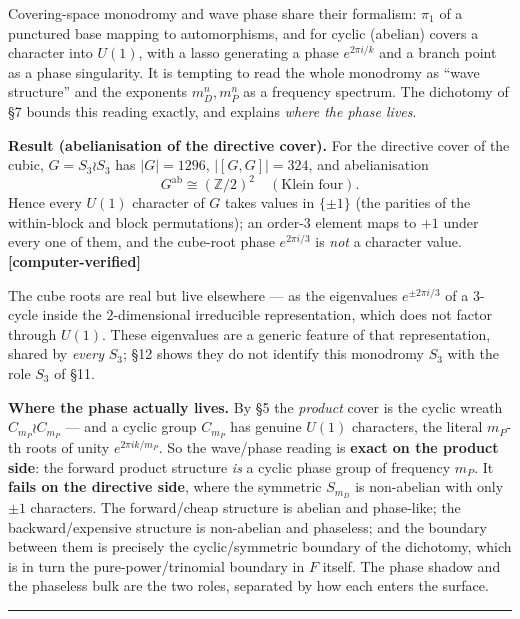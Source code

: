 \documentclass[11pt]{article}
\theoremstyle{plain}
\theoremstyle{definition}
\theoremstyle{remark}
\begin{document}
Covering-space monodromy and wave phase share their formalism: \(\pi_1\) of a punctured base mapping to automorphisms, and for cyclic (abelian) covers a character into \(U(1)\), with a lasso generating a phase \(e^{2\pi i/k}\) and a branch point as a phase singularity. It is tempting to read the whole monodromy as ``wave structure'' and the exponents \(m_D^n, m_P^n\) as a frequency spectrum. The dichotomy of §7 bounds this reading exactly, and explains \emph{where the phase lives}.

\textbf{Result (abelianisation of the directive cover).} For the directive cover of the cubic, \(G = S_3\wr S_3\) has \(|G| = 1296\), \(|[G,G]| = 324\), and abelianisation \[
G^{\mathrm{ab}} \cong (\mathbb Z/2)^2 \quad(\text{Klein four}).
\] Hence every \(U(1)\) character of \(G\) takes values in \(\{\pm 1\}\) (the parities of the within-block and block permutations); an order-\(3\) element maps to \(+1\) under every one of them, and the cube-root phase \(e^{2\pi i/3}\) is \emph{not} a character value. \textbf{{[}computer-verified{]}}

The cube roots are real but live elsewhere --- as the eigenvalues \(e^{\pm 2\pi i/3}\) of a \(3\)-cycle inside the \(2\)-dimensional irreducible representation, which does not factor through \(U(1)\). These eigenvalues are a generic feature of that representation, shared by \emph{every} \(S_3\); §12 shows they do not identify this monodromy \(S_3\) with the role \(S_3\) of §11.

\textbf{Where the phase actually lives.} By §5 the \emph{product} cover is the cyclic wreath \(C_{m_P}\wr C_{m_P}\) --- and a cyclic group \(C_{m_P}\) has genuine \(U(1)\) characters, the literal \(m_P\)-th roots of unity \(e^{2\pi i k/m_P}\). So the wave/phase reading is \textbf{exact on the product side}: the forward product structure \emph{is} a cyclic phase group of frequency \(m_P\). It \textbf{fails on the directive side}, where the symmetric \(S_{m_D}\) is non-abelian with only \(\pm 1\) characters. The forward/cheap structure is abelian and phase-like; the backward/expensive structure is non-abelian and phaseless; and the boundary between them is precisely the cyclic/symmetric boundary of the dichotomy, which is in turn the pure-power/trinomial boundary in \(F\) itself. The phase shadow and the phaseless bulk are the two roles, separated by how each enters the surface.

\begin{center}\rule{0.5\linewidth}{0.5pt}\end{center}
\end{document}
